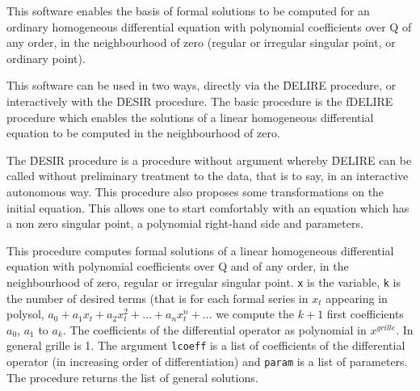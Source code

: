\documentclass[11pt,letterpaper]{book}
\makeatletter
\newcommand{\underscore}{\_}
\newcommand{\ttindex}[1]{{\renewcommand{\_}{\protect\underscore}%
                          \index{#1@{\tt #1}}}}
\makeatother
\begin{document}
\ttindex{DESIR}

This software enables the basis of formal solutions to be computed for an
ordinary homogeneous differential equation with polynomial coefficients
over Q of any order, in the neighbourhood of zero (regular or irregular
singular point, or ordinary point).

This software can be used in two ways, directly via the \f{DELIRE}
procedure, or interactively with the \f{DESIR} procedure.  The basic
procedure is the f{DELIRE} procedure which enables the solutions of a
linear homogeneous differential equation to be computed in the
neighbourhood of zero.

The \f{DESIR} procedure is a procedure without argument whereby
\f{DELIRE} can be called without preliminary treatment to the data,
that is to say, in an interactive autonomous way. This procedure also
proposes some transformations on the initial equation. This allows one
to start comfortably with an equation which has a non zero singular
point, a polynomial right-hand side and parameters.


This procedure computes formal solutions of a linear homogeneous
differential equation with polynomial coefficients over Q and of any
order, in the neighbourhood of zero, regular or irregular singular
point.  {\tt x} is the variable, {\tt k} is the number of desired
terms (that is for each formal series in $x_t$ appearing in polysol,
$a_0+a_1 x_t+a_2 x_t^2+\ldots + a_n x_t^n+ \ldots$ we compute the
$k+1$ first coefficients $a_0$, $a_1$ to $a_k$.  The coefficients of
the differential operator as polynomial in $x^{grille}$.  In general
grille is 1.  The argument {\tt lcoeff} is a list of coefficients of
the differential operator (in increasing order of differentiation) and
{\tt param} is a list of parameters.  The procedure returns the list
of general solutions.
\end{document}
